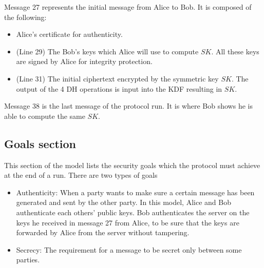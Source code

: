 \par
Message 27 represents the initial message from Alice to Bob. It is composed of the following:
\begin{itemize}\setlength\itemsep{-0.3em}
	\item Alice's certificate for authenticity.
	\item (Line 29) The Bob's keys which Alice will use to compute $ SK $. All these keys are signed by Alice for integrity protection.
	\item (Line 31) The initial ciphertext encrypted by the symmetric key $ SK $. The output of the 4 DH operations is input into the KDF resulting in $ SK $. 
\end{itemize}
\par
Message 38 is the last message of the protocol run. It is where Bob shows he is able to compute the same $ SK $. 
\subsection{Goals section}
This section of the model lists the security goals which the protocol must achieve at the end of a run. There are two types of goals
\begin{itemize}\setlength\itemsep{-0.3em}
	\item Authenticity: When a party wants to make sure a certain message has been generated and sent by the other party. In this model, Alice and Bob authenticate each others' public keys. Bob authenticates the server on the keys he received in message 27 from Alice, to be sure that the keys are forwarded by Alice from the server without tampering.
	\item Secrecy: The requirement for a message to be secret only between some parties.
\end{itemize}



